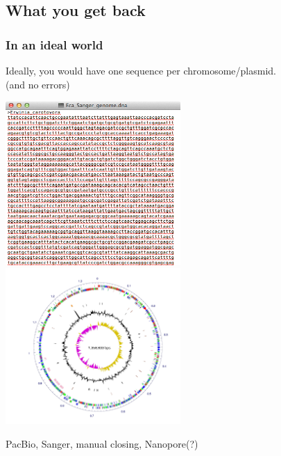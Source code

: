 
\subsection{What you get back}

\begin{frame}
  \frametitle{In an ideal world}
  Ideally, you would have one sequence per chromosome/plasmid.\\
  (and no errors)
  \begin{center}
    \includegraphics[width=0.5\textwidth]{images/pba_sequence}
    \includegraphics[width=0.5\textwidth]{images/complete_genome_circle}
  \end{center}    
  PacBio, Sanger, manual closing, Nanopore(?)
\end{frame}

